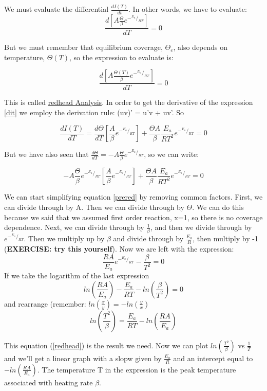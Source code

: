 \documentclass[ignorenonframetext]{beamer}
\begin{document}
We must evaluate the differential \(\frac{dI(T)}{dt}\). In other words, we have to evaluate:
\[\frac{d\left[A\frac{\Theta}{\beta}e^{-^{E_a}/_{RT}}\right]}{dT} = 0\]

But we must remember that equilibrium coverage, \(\Theta_e\), also depends on temperature, \(\Theta(T)\), so the expression to evaluate is:

\begin{equation}\label{dit} \frac{d\left[A\frac{\Theta(T)}{\beta}e^{-^{E_a}/_{RT}}\right]}{dT} = 0\end{equation}

This is called \underline{redhead Analysis}. In order to get the derivative of the expression \ref{dit} we employ the derivation rule: (uv)' = u'v + uv'. So

\[\frac{dI(T)}{dT} = \frac{d\Theta}{dT}\left[\frac{A}{\beta}e^{-^{E_a}/_{RT}}\right]+\frac{\Theta A}{\beta}\frac{E_a}{RT^2}e^{-^{E_a}/_{RT}}=0\]

But we have also seen that \(\frac{d\Theta}{dT} = -A\frac{\Theta}{\beta}e^{-^{E_a}/_{RT}}\), so we can write:

\begin{equation}\label{prered} -A\frac{\Theta}{\beta}e^{-^{E_a}/_{RT}}\left[\frac{A}{\beta}e^{-^{E_a}/_{RT}}\right]+\frac{\Theta A}{\beta}\frac{E_a}{RT^2}e^{-^{E_a}/_{RT}}=0\end{equation}

We can start simplifying equation \ref{prered} by removing common factors. First, we can divide through by A. Then we can divide through by \(\Theta\). We can do this because we said that we assumed first order reaction, x=1, so there is no coverage dependence. Next, we can divide through by \(\frac{1}{\beta}\), and then we divide through by \(e^{-^{E_a}/_{RT}}\). Then we multiply up by \(\beta\) and divide through by \(\frac{E_a}{R}\), then multiply by -1 (\textbf{EXERCISE: try this yourself}). Now we are left with the expression:
\[\frac{RA}{E_a}e^{-^{E_a}/_{RT}} - \frac{\beta}{T^2} = 0\]
If we take the logarithm of the last expression
\[ln\left(\frac{RA}{E_a}\right) - \frac{E_a}{RT} - ln\left(\frac{\beta}{T^2}\right) = 0\]
and rearrange (remember: \(ln\left(\frac{x}{y}\right) = -ln\left(\frac{y}{x}\right)\)
\begin{equation}\label{redhead}
\boxed{ln\left(\frac{T^2}{\beta}\right) = \frac{E_a}{RT} - ln\left(\frac{RA}{E_a}\right)}
\end{equation}

This equation (\ref{redhead}) is the result we need. Now we can plot \(ln\left(\frac{T^2}{\beta}\right)\) vs \(\frac{1}{T}\) and we'll get a linear graph with a slopw given by \(\frac{E_a}{R}\) and an intercept equal to \(-ln\left(\frac{RA}{E_a}\right)\). The temperature T in the expression is the peak temperature associated with heating rate \(\beta\).
\end{document}

